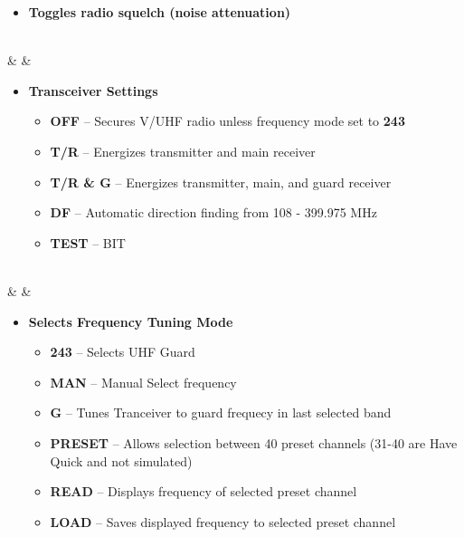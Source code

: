 \documentclass[fontInter]{TechCheck}
\begin{document}
\begin{listlongtable}
\begin{minipage}[t]{\linewidth}
			\vspace{-7pt}
			\begin{itemize}
				\item \textbf{Toggles radio squelch (noise attenuation)}
			\end{itemize}
		\end{minipage} \\
		\midrule
		\textbf{\textbullet} &  &
		\begin{minipage}[t]{\linewidth}
			\vspace{-7pt}
			\begin{itemize}
				\item \textbf{Transceiver Settings}
				\begin{itemize}
					\item \textbf{OFF} -- Secures V/UHF radio unless frequency mode set to \textbf{243}
					\item \textbf{T/R} -- Energizes transmitter and main receiver
					\item \textbf{T/R \& G} -- Energizes transmitter, main, and guard receiver
					\item \textbf{DF} -- Automatic direction finding from 108 - 399.975 MHz
					\item \textbf{TEST} -- BIT
				\end{itemize}
			\end{itemize}
		\end{minipage} \\
		\midrule
		\textbf{\textbullet} &   &
		\begin{minipage}[t]{\linewidth}
			\vspace{-7pt}
			\begin{itemize}
				\item \textbf{Selects Frequency Tuning Mode}
				\begin{itemize}
					\item \textbf{243} -- Selects UHF Guard
					\item \textbf{MAN} -- Manual Select frequency
					\item \textbf{G} -- Tunes Tranceiver to guard frequecy in last selected band
					\item \textbf{PRESET} -- Allows selection between 40 preset channels
					(31-40 are Have Quick and not simulated)
					\item \textbf{READ} -- Displays frequency of selected preset channel
					\item \textbf{LOAD} --  Saves displayed frequency to selected preset channel

\end{itemize}
\end{itemize}
\end{minipage}
\end{listlongtable}
\end{document}
